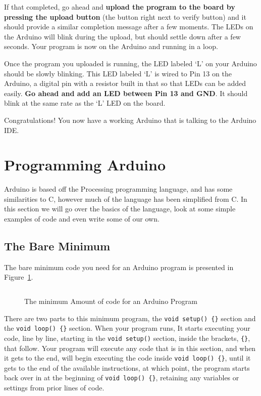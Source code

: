 \documentclass[11pt,a4paper]{article}
\begin{document}
If that completed, go ahead and \textbf{upload the program to the board by pressing the upload button} (the button right next to verify button) and it should provide a similar completion message after a few moments.  The LEDs on the Arduino will blink during the upload, but should settle down after a few seconds.  Your program is now on the Arduino and running in a loop.
    
Once the program you uploaded is running, the LED labeled `L' on your Arduino should be slowly blinking.  This LED labeled `L' is wired to Pin 13 on the Arduino, a digital pin with a resistor built in that so that LEDs can be added easily.  \textbf{Go ahead and add an LED between Pin 13 and GND}.  It should blink at the same rate as the `L' LED on the board.



Congratulations!  You now have a working Arduino that is talking to the Arduino IDE.


\section{Programming Arduino} %
\label{sec:programming_arduino}

Arduino is based off the Processing\cite{processing} programming language, and has some similarities to C, however much of the language has been simplified from C.  In this section we will go over the basics of the language, look at some simple examples of code and even write some of our own.

\subsection{The Bare Minimum} %
\label{sub:the_bare_minimum}

The bare minimum code you need for an Arduino program is presented in Figure~\ref{fig:bare}.

\begin{figure}[htbp]
	\centering
\inputminted[mathescape,linenos,numbersep=5pt,gobble=0,frame=lines,framesep=2mm]{c}{code/BareMinimum/BareMinimum.ino}
	\caption{The minimum Amount of code for an Arduino Program}
	\label{fig:bare}
\end{figure}

There are two parts to this minimum program, the \texttt{void setup() \{\}} section and the \texttt{void loop() \{\}} section.  When your program runs, It starts executing your code, line by line, starting in the \texttt{void setup()} section, inside the brackets, \texttt{\{\}}, that follow.  Your program will execute any code that is in this section, and when it gets to the end, will begin executing the code inside \texttt{void loop() \{\}}, until it gets to the end of the available instructions, at which point, the program starts back over in at the beginning of \texttt{void loop() \{\}}, retaining any variables or settings from prior lines of code.
\end{document}
